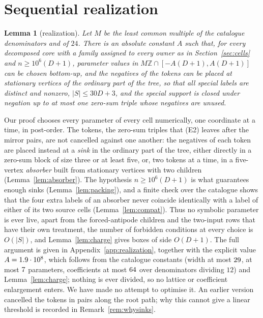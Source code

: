 \documentclass[11pt,a4paper]{article}
\theoremstyle{plain}
\newtheorem{lemma}[theorem]{Lemma}
\theoremstyle{definition}
\theoremstyle{remark}
\newcommand{\Z}{\mathbb{Z}}
\begin{document}
\section{Sequential realization}\label{sec:realization}

\begin{lemma}[realization]\label{lem:realization}
Let $M$ be the least common multiple of the catalogue denominators and of
$24$.  There is an absolute constant $A$ such that, for every decomposed core
with a family assigned to every owner as in Section~\ref{sec:cells} and
$n\ge 10^6(D+1)$, parameter values in $M\Z\cap[-A(D+1),A(D+1)]$ can be
chosen bottom-up, and the negatives of the tokens can be placed at stationary
vertices of the ordinary part of the tree, so that all special labels are
distinct and nonzero, $|S|\le 30D+3$, and the special support is closed under
negation up to at most one zero-sum triple whose negatives are unused.
\end{lemma}

Our proof chooses every parameter of every cell numerically, one coordinate
at a time, in post-order.  The tokens, the zero-sum triples that (E2) leaves
after the mirror pairs, are not cancelled against one another: the negatives
of each token are placed instead at a \emph{sink} in the ordinary part of the
tree, either directly in a zero-sum block of size three or at least five, or,
two tokens at a time, in a five-vertex \emph{absorber} built from stationary
vertices with two children (Lemma~\ref{lem:absorber}).  The hypothesis
$n\ge 10^6(D+1)$ is what guarantees enough sinks
(Lemma~\ref{lem:packing}), and a finite check over the catalogue shows that
the four extra labels of an absorber never coincide identically with a label
of either of its two source cells (Lemma~\ref{lem:compat}).  Thus no symbolic
parameter is ever live, apart from the forced-antipode children and the
two-input rows that have their own treatment, the number of forbidden
conditions at every choice is $O(|S|)$, and Lemma~\ref{lem:charge} gives boxes
of side $O(D+1)$.  The full argument is given in Appendix~\ref{app:realization},
together with the explicit value $A=1.9\cdot 10^{8}$, which follows from the catalogue
constants (width at most $29$, at most $7$ parameters,
coefficients at most $64$ over denominators dividing $12$) and
Lemma~\ref{lem:charge}; nothing is ever divided, so no lattice or coefficient
enlargement enters.  We have made no attempt to optimise it.  An earlier
version cancelled the tokens in pairs along the root path; why this cannot
give a linear threshold is recorded in Remark~\ref{rem:whysinks}.
\end{document}
